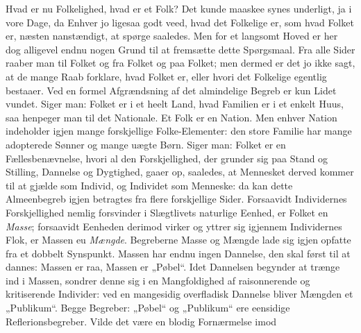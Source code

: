 \documentclass[12pt,a4paper]{book}
\begin{document}
Hvad er nu Folkelighed, hvad er et Folk? Det kunde maaskee synes underligt, ja i vore
Dage, da Enhver jo ligesaa godt veed, hvad det Folkelige er, som hvad Folket er, næsten
nanstændigt, at spørge saaledes. Men for et langsomt Hoved er her dog alligevel endnu
nogen Grund til at fremsætte dette Spørgsmaal. Fra alle Sider raaber man til Folket og fra
Folket og paa Folket; men dermed er det jo ikke sagt, at de mange Raab forklare, hvad
Folket er, eller hvori det Folkelige egentlig bestaaer. Ved en formel Afgrændsning af det
almindelige Begreb er kun Lidet vundet. Siger man: Folket er i et heelt Land, hvad
Familien er i et enkelt Huus, saa henpeger man til det Nationale. Et Folk er en Nation.
Men enhver Nation indeholder igjen mange forskjellige Folke-Elementer: den store Familie
har mange adopterede Sønner og mange uægte Børn. Siger man: Folket er en Fællesbenævnelse,
hvori al den Forskjellighed, der grunder sig paa Stand og Stilling, Dannelse og Dygtighed,
gaaer op, saaledes, at Mennesket derved kommer til at gjælde som Individ, og Individet som
Menneske: da kan dette Almeenbegreb igjen betragtes fra flere forskjellige Sider.
Forsaavidt Individernes Forskjellighed nemlig forsvinder i Slægtlivets naturlige Eenhed,
er Folket en \emph{Masse}; forsaavidt Eenheden derimod virker og yttrer sig igjennem
Individernes Flok,
er Massen eu \emph{Mængde}. Begreberne Masse og Mængde lade sig igjen opfatte fra et
dobbelt Synspunkt. Massen har endnu ingen Dannelse, den skal først til at dannes: Massen
er raa, Massen er „Pøbel“. Idet Dannelsen begynder at trænge ind i Massen, sondrer denne
sig i en Mangfoldighed af raisonnerende og kritiserende Individer: ved en mangesidig
overfladisk Dannelse bliver Mængden et „Publikum“. Begge Begreber: „Pøbel“ og „Publikum“
ere eensidige Reflerionsbegreber. Vilde det være en blodig Fornærmelse imod
\end{document}
